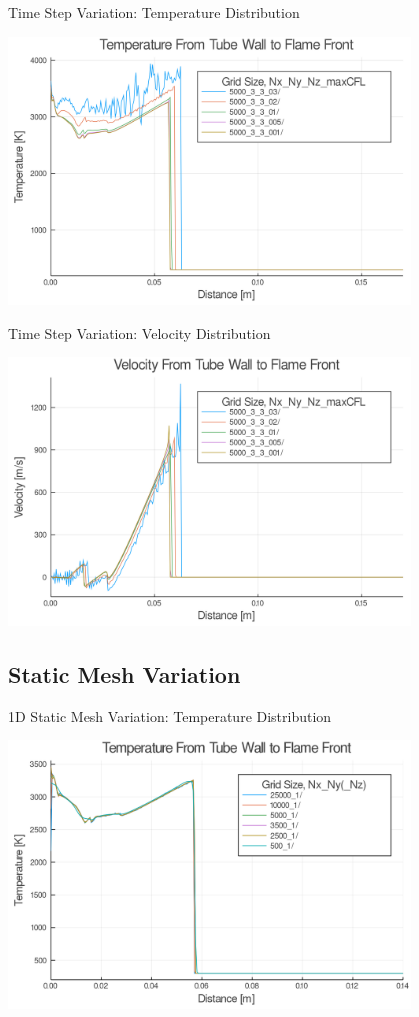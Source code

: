 \begin{frame}{Time Step Variation: Temperature Distribution}
\begin{center}
\includegraphics[width=0.8\textwidth]{../figs/cfl_test/t.png}
\end{center}
\end{frame}

\begin{frame}{Time Step Variation: Velocity Distribution}
\begin{center}
\includegraphics[width=0.8\textwidth]{../figs/cfl_test/u.png}
\end{center}
\end{frame}

\subsection{Static Mesh Variation}

\begin{frame}{1D Static Mesh Variation: Temperature Distribution}
\begin{center}
\includegraphics[width=0.8\textwidth]{../figs/static1d/t.png}
\end{center}
\end{frame}


